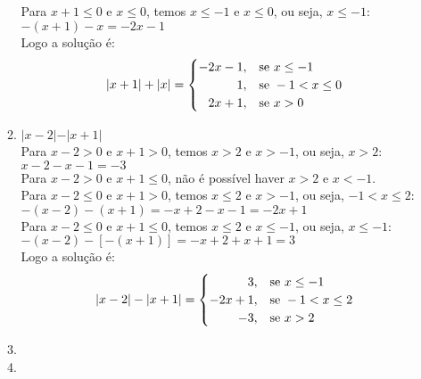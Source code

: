 \documentclass[10pt]{book}
\begin{document}
\begin{enumerate}
\begin{enumerate}
			Para $x + 1 \leq 0$ e $x \leq 0$, temos $x \leq -1$ e $x \leq 0$, ou seja, $x \leq -1$:\\		
			$-(x + 1) -x = -2x - 1$\\
			Logo a solução é:\\
			\begin{equation*}
		    	\vert x + 1 \vert + \vert x \vert =
			    \begin{cases}
			      -2x - 1, & \text{se}\ x \leq -1 \\
			      \hfill 1, & \text{se}\ -1 < x \leq 0 \\
			      \hfill 2x + 1, & \text{se}\ x > 0 
		    	\end{cases}
			\end{equation*}
			\item %
			$\vert x - 2\vert - \vert x + 1 \vert$\\
			Para $x - 2 > 0$ e $x + 1 > 0$, temos $x > 2$ e $x > -1$, ou seja, $x > 2$:\\
			$x - 2 - x - 1 = -3$\\
			Para $x - 2 > 0$ e $x + 1 \leq 0$, não é possível haver $x > 2$ e $ x < -1$.\\
			Para $x - 2 \leq 0$ e $x + 1 > 0$, temos $x \leq 2$ e $x > -1$, ou seja, $-1 < x \leq 2$:\\
			$-(x - 2) - (x + 1) = -x + 2 - x - 1 = -2x + 1$\\
			Para $x - 2 \leq 0$ e $x + 1 \leq 0$, temos $x \leq 2$ e $x \leq -1$, ou seja, $x \leq -1$:\\
			$-(x - 2) - [-(x + 1)] = -x + 2 + x + 1 = 3$\\
			Logo a solução é:\\
			\begin{equation*}
		    	\vert x - 2 \vert - \vert x + 1 \vert =
			    \begin{cases}
			      \hfill 3, & \text{se}\ x \leq -1 \\
			      -2x + 1, & \text{se}\ -1 < x \leq 2 \\
			      \hfill -3, & \text{se}\ x > 2 
		    	\end{cases}
			\end{equation*}
			\item %
			\item %
		\end{enumerate}
\end{enumerate}
\end{document}
